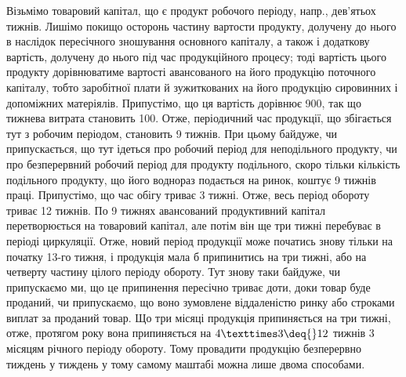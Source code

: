 Візьмімо товаровий капітал, що є продукт робочого періоду, напр.,
де\-в’я\-тьох тижнів. Лишімо покищо осторонь частину вартости продукту,
долучену до нього в наслідок пересічного зношування основного капіталу,
а також і додаткову вартість, долучену до нього під час продукційного
процесу; тоді вартість цього продукту дорівнюватиме вартості
авансованого на його продукцію поточного капіталу, тобто заробітної плати
й зужиткованих на його продукцію сировинних і допоміжних матеріялів.
Припустімо, що ця вартість дорівнює 900, так що тижнева
витрата становить 100. Отже, періодичний час продукції, що
збігається тут з робочим періодом, становить 9 тижнів. При цьому байдуже,
чи припускається, що тут ідеться про робочий період для неподільного
продукту, чи про безперервний робочий період для продукту
подільного, скоро тільки кількість подільного продукту, що його воднораз
подається на ринок, коштує 9 тижнів праці. Припустімо, що час
обігу триває 3 тижні. Отже, весь період обороту триває 12 тижнів.
По 9 тижнях авансований продуктивний капітал перетворюється на товаровий
капітал, але потім він ще три тижні перебуває в періоді циркуляції.
Отже, новий період продукції може початись знову тільки на початку
13-го тижня, і продукція мала б припинитись на три тижні, або на
четверту частину цілого періоду обороту. Тут знову таки байдуже, чи
припускаємо ми, що це припинення пересічно триває доти, доки товар
буде проданий, чи припускаємо, що воно зумовлене віддаленістю ринку
або строками виплат за проданий товар. Що три місяці продукція
припиняється на три тижні, отже, протягом року вона припиняється на
$4×3 \deq{} 12$ тижнів \deq{} 3 місяцям \deq{}  річного періоду обороту. Тому
провадити продукцію безперервно тиждень у тиждень у тому самому
маштабі можна лише двома способами.

